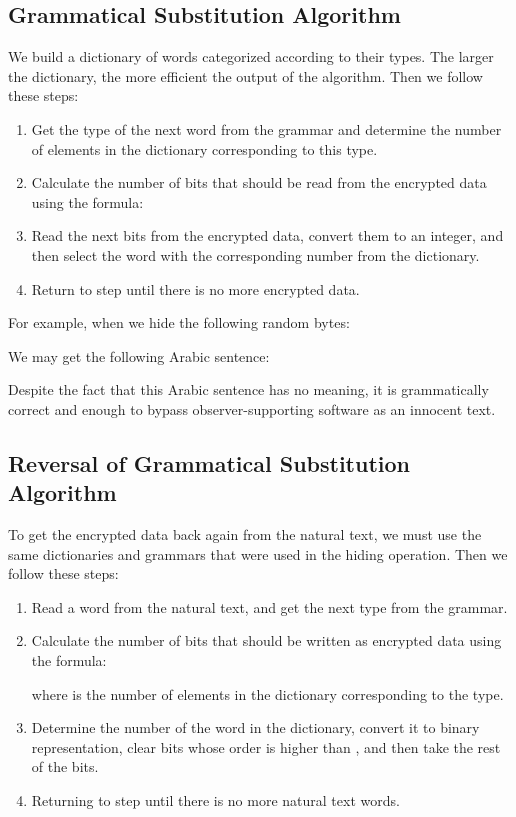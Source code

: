 \documentclass{acm_proc_article-sp}
\begin{document}
\subsection{Grammatical Substitution Algorithm}\label{Grammatical-Substitution-Algorithm}
We build a dictionary of words categorized according to their types. The larger the dictionary, the more efficient the output of the algorithm. Then we follow these steps:
\begin{enumerate}
    \item Get the type of the next word from the grammar and determine the number of elements  in the dictionary corresponding to this type.
    \item Calculate the number of bits that should be read from the encrypted data using the formula:
    
    \item Read the next  bits from the encrypted data, convert them to an integer, and then select the word with the corresponding number from the dictionary.
    \item Return to step  until there is no more encrypted data.
\end{enumerate}
For example, when we hide the following random bytes:

We may get the following Arabic sentence:

Despite the fact that this Arabic sentence has no meaning, it is grammatically correct and enough to bypass observer-supporting software as an innocent text.

\subsection{Reversal of Grammatical Substitution Algorithm}\label{Reversal-of-Grammatical-Substitution-Algorithm}
To get the encrypted data back again from the natural text, we must use the same dictionaries and grammars that were used in the hiding operation. Then we follow these steps:
\begin{enumerate}
    \item Read a word from the natural text, and get the next type from the grammar.
    \item Calculate the number of bits that should be written as encrypted data using the formula:
    
    where  is the number of elements in the dictionary corresponding to the type.
    \item Determine the number of the word in the dictionary, convert it to binary representation, clear bits whose order is higher than , and then take the rest of the bits.
    \item Returning to step  until there is no more natural text words.
\end{enumerate}
\end{document}

